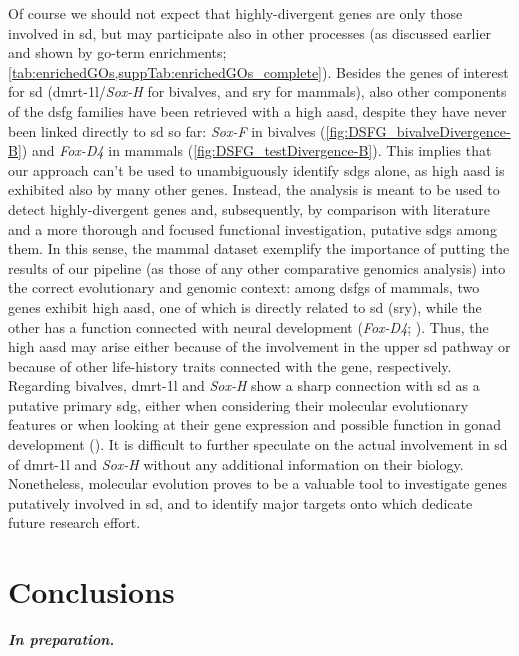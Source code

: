 Of course we should not expect that highly-divergent genes are only those involved in \gls{sd}, but may participate also in other processes (as discussed earlier and shown by \gls{go}-term enrichments; \cref{tab:enrichedGOs,suppTab:enrichedGOs_complete}). Besides the genes of interest for \gls{sd} (\gls{dmrt-1l}/\textit{Sox-H} for bivalves, and \gls{sry} for mammals), also other components of the \gls{dsfg} families have been retrieved with a high \gls{aasd}, despite they have never been linked directly to \gls{sd} so far: \textit{Sox-F} in bivalves (\cref{fig:DSFG_bivalveDivergence-B}) and \textit{Fox-D4} in mammals (\cref{fig:DSFG_testDivergence-B}). This implies that our approach can't be used to unambiguously identify \glspl{sdg} alone, as high \gls{aasd} is exhibited also by many other genes. Instead, the analysis is meant to be used to detect highly-divergent genes and, subsequently, by comparison with literature and a more thorough and focused functional investigation, putative \glspl{sdg} among them. In this sense, the mammal dataset exemplify the importance of putting the results of our pipeline (as those of any other comparative genomics analysis) into the correct evolutionary and genomic context: among \glspl{dsfg} of mammals, two genes exhibit high \gls{aasd}, one of which is directly related to \gls{sd} (\gls{sry}), while the other has a function connected with neural development (\textit{Fox-D4}; ). Thus, the high \gls{aasd} may arise either because of the involvement in the upper \gls{sd} pathway or because of other life-history traits connected with the gene, respectively. Regarding bivalves, \gls{dmrt-1l} and \textit{Sox-H} show a sharp connection with \gls{sd} as a putative primary \gls{sdg}, either when considering their molecular evolutionary features or when looking at their gene expression and possible function in gonad development (). It is difficult to further speculate on the actual involvement in \gls{sd} of \gls{dmrt-1l} and \textit{Sox-H} without any additional information on their biology. Nonetheless, molecular evolution proves to be a valuable tool to investigate genes putatively involved in \gls{sd}, and to identify major targets onto which dedicate future research effort.

\section{Conclusions} \label{chapter3_conclusions}

\textbf{\textit{In preparation.}}

\clearpage


% 
